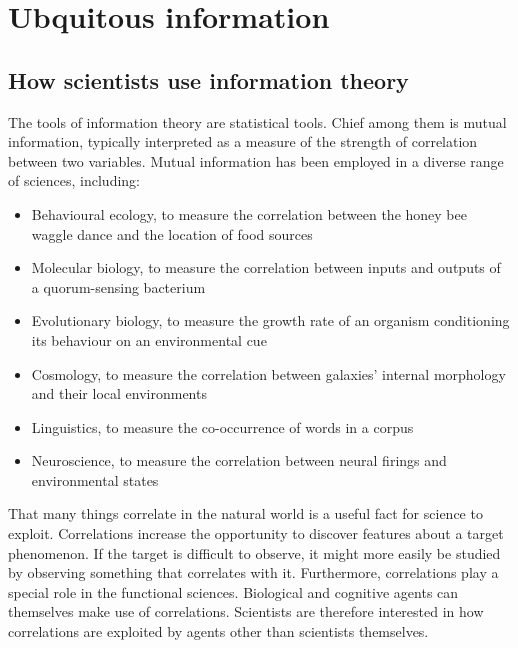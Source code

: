 \section{Ubquitous information}\label{sec:ubiquitous}

\subsection{How scientists use information theory}\label{subsec:scientists}

The tools of information theory are statistical tools.
Chief among them is mutual information, typically interpreted as a measure of the strength of correlation between two variables.
Mutual information has been employed in a diverse range of sciences, including:

\begin{itemize}
    \item Behavioural ecology, to measure the correlation between the honey bee waggle dance and the location of food sources \citep{haldane1954statistical}
    \item Molecular biology, to measure the correlation between inputs and outputs of a quorum-sensing bacterium \citep{mehta2009information}
    \item Evolutionary biology, to measure the growth rate of an organism conditioning its behaviour on an environmental cue \citep{donaldson-matasci2010fitness}
    \item Cosmology, to measure the correlation between galaxies' internal morphology and their local environments \citep{pandey2017how}
    \item Linguistics, to measure the co-occurrence of words in a corpus \citep[$\S$4]{hunston2002corpora}
    \item Neuroscience, to measure the correlation between neural firings and environmental states \citep[][and references therein]{rathkopf2017neural}
\end{itemize}

\noindent That many things correlate in the natural world is a useful fact for science to exploit.
Correlations increase the opportunity to discover features about a target phenomenon.
If the target is difficult to observe, it might more easily be studied by observing something that correlates with it. 
Furthermore, correlations play a special role in the functional sciences.
Biological and cognitive agents can themselves make use of correlations.
Scientists are therefore interested in how correlations are exploited by agents other than scientists themselves.

